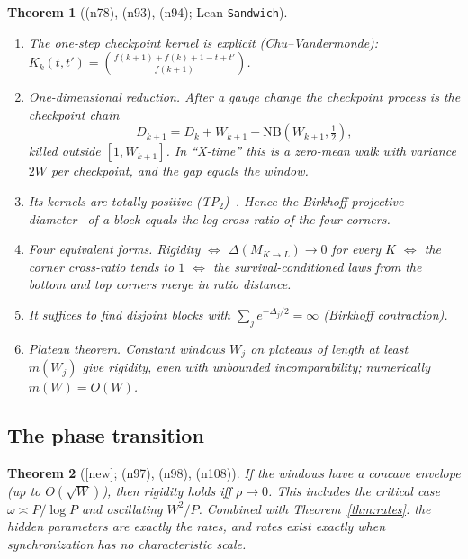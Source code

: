\documentclass[11pt]{article}
\newtheorem{theorem}{Theorem}[section]
\theoremstyle{definition}
\theoremstyle{remark}
\newcommand{\NB}{\mathrm{NB}}
\newcommand{\lean}[1]{\texttt{#1}}
\newcommand{\status}[1]{\textsf{[#1]}}
\newcommand{\note}[1]{\textsf{(n#1)}}
\begin{document}
\begin{theorem}[\note{78}, \note{93}, \note{94}; Lean \lean{Sandwich}]\label{thm:reduction}
\leavevmode
\begin{enumerate}
\item The one-step checkpoint kernel is explicit (Chu--Vandermonde): $K_k(t,t')=\binom{f(k+1)+f(k)+1-t+t'}{f(k+1)}$.
\item \emph{One-dimensional reduction.} After a gauge change the checkpoint process is the \emph{checkpoint chain}
  \[D_{k+1}=D_k+W_{k+1}-\NB(W_{k+1},\tfrac12),\]
  killed outside $[1,W_{k+1}]$. In ``X-time'' this is a zero-mean walk with variance $2W$ per checkpoint, and the gap equals the window.
\item Its kernels are totally positive (TP$_2$)~\cite{KarlinRinott80}. Hence the Birkhoff projective diameter~\cite{Birkhoff57} of a block equals the log cross-ratio of the four corners.
\item \emph{Four equivalent forms.} Rigidity $\iff$ $\Delta(M_{K\to L})\to0$ for every $K$ $\iff$ the corner cross-ratio tends to $1$ $\iff$ the survival-conditioned laws from the bottom and top corners merge in ratio distance.
\item It suffices to find disjoint blocks with $\sum_je^{-\Delta_j/2}=\infty$ (Birkhoff contraction).
\item \emph{Plateau theorem.} Constant windows $W_j$ on plateaus of length at least $m(W_j)$ give rigidity, even with unbounded incomparability; numerically $m(W)=O(W)$.
\end{enumerate}
\end{theorem}

\subsection{The phase transition}

\begin{theorem}[\status{new}; \note{97}, \note{98}, \note{108}]\label{thm:phase}
If the windows have a concave envelope (up to $O(\sqrt W)$), then rigidity holds iff $\rho\to0$. This includes the critical case $\omega\asymp P/\log P$ and oscillating $W^2/P$. Combined with Theorem~\ref{thm:rates}: \emph{the hidden parameters are exactly the rates, and rates exist exactly when synchronization has no characteristic scale.}
\end{theorem}
\end{document}
